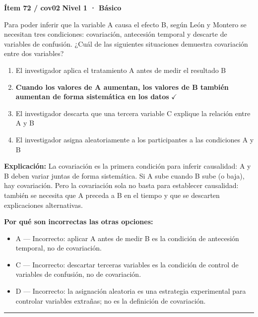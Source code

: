 \documentclass[12pt,a4paper]{article}
\begin{document}
\begin{mdframed}[backgroundcolor=fondogris,linecolor=azul,linewidth=1pt,innerleftmargin=10pt,innerrightmargin=10pt,innertopmargin=7pt,innerbottommargin=7pt]
\textbf{Ítem 72 / cov02} \hfill {\small\bfseries\color{azul} Nivel 1 · Básico}
\end{mdframed}

Para poder inferir que la variable A causa el efecto B, según León y Montero se necesitan tres condiciones: covariación, antecesión temporal y descarte de variables de confusión. ¿Cuál de las siguientes situaciones demuestra covariación entre dos variables?

\begin{enumerate}
  \item[A.] El investigador aplica el tratamiento A antes de medir el resultado B
  \item[\textbf{\color{verde}B.}] \textbf{\color{verde} Cuando los valores de A aumentan, los valores de B también aumentan de forma sistemática en los datos} \hfill $\checkmark$
  \item[C.] El investigador descarta que una tercera variable C explique la relación entre A y B
  \item[D.] El investigador asigna aleatoriamente a los participantes a las condiciones A y B
\end{enumerate}

\noindent\textbf{\color{azul}Explicación:} La covariación es la primera condición para inferir causalidad: A y B deben variar juntas de forma sistemática. Si A sube cuando B sube (o baja), hay covariación. Pero la covariación sola no basta para establecer causalidad: también se necesita que A preceda a B en el tiempo y que se descarten explicaciones alternativas.

\noindent\textbf{\color{gris}Por qué son incorrectas las otras opciones:}
\begin{itemize}
  \item {\small A — Incorrecto: aplicar A antes de medir B es la condición de antecesión temporal, no de covariación.}
  \item {\small C — Incorrecto: descartar terceras variables es la condición de control de variables de confusión, no de covariación.}
  \item {\small D — Incorrecto: la asignación aleatoria es una estrategia experimental para controlar variables extrañas; no es la definición de covariación.}
\end{itemize}
\vspace{8pt}\hrule\vspace{10pt}
\end{document}
